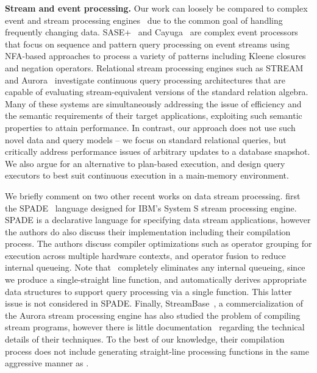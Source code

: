 \noindent \textbf{Stream and event processing.}
Our work can loosely be compared to complex event and stream processing
engines~\cite{wu-sigmod:06,agrawal-sigmod:08,white-pods:07,motwani-cidr:03,abadi-vldbj:03}
due to the common goal of handling frequently changing data.
SASE+~\cite{agrawal-sigmod:08} and Cayuga~\cite{white-pods:07} are complex event
processors that focus on sequence and pattern query processing on event streams
using NFA-based approaches to process a variety of patterns including Kleene
closures and negation operators. Relational stream processing engines such as
STREAM~\cite{motwani-cidr:03} and Aurora~\cite{abadi-vldbj:03} investigate
continuous query processing architectures that are capable of evaluating
stream-equivalent versions of the standard relation algebra.
Many of these systems are simultaneously addressing the issue of efficiency and
the semantic requirements of their target applications, exploiting such semantic
properties to attain performance. In contrast, our approach does not use such
novel data and query models -- we focus on standard relational queries, but
critically address performance issues of arbitrary updates to a database snapshot. We
also argue for an alternative to plan-based execution, and design query
executors to best suit continuous execution in a main-memory environment.

We briefly comment on two other recent works on data stream processing. first
the SPADE~\cite{gedik-sigmod:08} language designed for IBM's System S stream
processing engine. SPADE is a declarative language for specifying data stream
applications, however the authors do also discuss their implementation including
their compilation process. The authors discuss compiler optimizations such as
operator grouping for execution across multiple hardware contexts, and operator
fusion to reduce internal queueing. Note that \compiler\ completely eliminates
any internal queueing, since we produce a single-straight line function, and
automatically derives appropriate data structures to support query processing
via a single function. This latter issue is not considered in SPADE. Finally,
StreamBase~\cite{streambase}, a commercialization of the Aurora stream
processing engine has also studied the problem of compiling stream programs,
however there is little documentation~\cite{sb-patent} regarding the technical
details of their techniques. To the best of our knowledge, their compilation
process does not include generating straight-line processing functions in the
same aggressive manner as \compiler.

